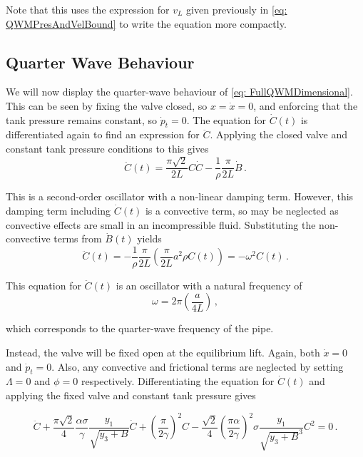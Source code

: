 Note that this uses the expression for $v_L$ given previously in \cref{eq: QWMPresAndVelBound} to write the equation more compactly.

\subsection{Quarter Wave Behaviour}

We will now display the quarter-wave behaviour of \cref{eq: FullQWMDimensional}. This can be seen by fixing the valve closed, so $x = \dot{x} = 0$, and enforcing that the tank pressure remains constant, so $\dot{p}_t = 0$. The  equation for $\dot{C}(t)$ is differentiated again to find an expression for $\ddot{C}$. Applying the closed valve and constant tank pressure conditions to this gives
~
\begin{equation*}
    \ddot{C}(t) = \frac{\pi \sqrt{2}}{2 L} C \dot{C} - \frac{1}{\rho} \frac{\pi}{2 L} \dot{B} \, .
\end{equation*}

This is a second-order oscillator with a non-linear damping term. However, this damping term including $\dot{C}(t)$ is a convective term, so may be neglected as convective effects are small in an incompressible fluid. Substituting the non-convective terms from $\dot{B}(t)$ yields
~
\begin{equation*}
    \ddot{C}(t) = - \frac{1}{\rho} \frac{\pi}{2 L} \left( \frac{\pi}{2L} a^2 \rho C(t) \right) = - \omega^2 C(t) \, .
\end{equation*}

This equation for $\ddot{C}(t)$ is an oscillator with a natural frequency of
~
\begin{equation*}
    \omega = 2 \pi \left( \frac{a}{4 L} \right) \, ,
\end{equation*}

which corresponds to the quarter-wave frequency of the pipe.

Instead, the valve will be fixed open at the equilibrium lift. Again, both $\dot{x} = 0$ and $\dot{p}_t = 0$. Also, any convective and frictional terms are neglected by setting $\Lambda = 0$ and $\phi = 0$ respectively. Differentiating the equation for $\dot{C}(t)$ and applying the fixed valve and constant tank pressure gives

\begin{equation*}
    \ddot{C} + \frac{\pi \sqrt{2}}{4} \frac{\alpha \sigma}{\gamma} \frac{y_1}{\sqrt{y_3 + B}} \dot{C} + \left( \frac{\pi}{2 \gamma} \right)^2 C - \frac{\sqrt{2}}{4} \left( \frac{\pi \alpha}{2 \gamma} \right)^2 \sigma \frac{y_1}{\sqrt{y_3 + B}^3} C^2 = 0 \, .
\end{equation*}

